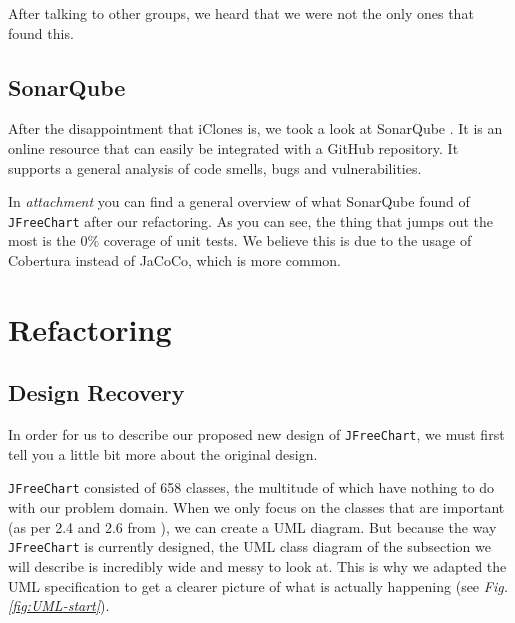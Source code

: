 \documentclass[11pt]{article}
\begin{document}
	After talking to other groups, we heard that we were not the only ones that found this.
	
	\subsection{SonarQube}
	\label{sec:sonarqube}
	After the disappointment that \textsf{iClones} is, we took a look at \textsf{SonarQube} \cite{sonarqube}. It is an online resource that can easily be integrated with a \textsf{GitHub} repository. It supports a general analysis of code smells, bugs and vulnerabilities.
	
	In \textsl{attachment \pageref{sonarcloud-orig}} you can find a general overview of what \textsf{SonarQube} found of \texttt{JFreeChart} after our refactoring. As you can see, the thing that jumps out the most is the 0\% coverage of unit tests. We believe this is due to the usage of \textsf{Cobertura} instead of \textsf{JaCoCo}, which is more common.
	
	
	\section{Refactoring}
	\subsection{Design Recovery}
	In order for us to describe our proposed new design of \texttt{JFreeChart}, we must first tell you a little bit more about the original design.
	
	\texttt{JFreeChart} consisted of 658 classes, the multitude of which have nothing to do with our problem domain. When we only focus on the classes that are important (as per 2.4 and 2.6 from \cite{demeyer2009object}), we can create a UML diagram. But because the way \texttt{JFreeChart} is currently designed, the UML class diagram of the subsection we will describe is incredibly wide and messy to look at. This is why we adapted the UML specification to get a clearer picture of what is actually happening (see \textsl{Fig.\,\ref{fig:UML-start}}).
	
\end{document}
